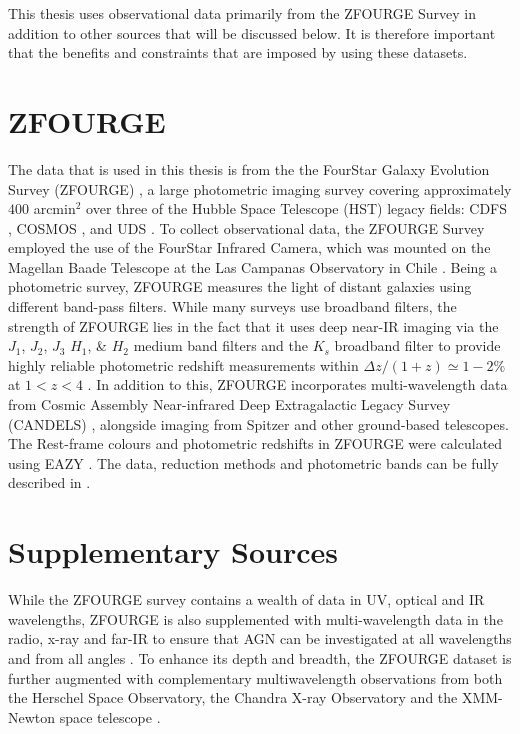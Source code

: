 This thesis uses observational data primarily from the ZFOURGE Survey in addition to other sources that will be discussed below. It is therefore important that the benefits and constraints that are imposed by using these datasets.

\section{ZFOURGE}
The data that is used in this thesis is from the the FourStar Galaxy Evolution Survey (ZFOURGE) \citep{straatman_fourstar_2016}, a large photometric imaging survey covering approximately $400$ arcmin$^2$ over three of the Hubble Space Telescope (HST) legacy fields: CDFS \citep{giacconi_chandra_2002}, COSMOS \citep{scoville_cosmic_2007}, and UDS \citep{lawrence_ukirt_2007}. To collect observational data, the ZFOURGE Survey employed the use of the FourStar Infrared Camera, which was mounted on the Magellan Baade Telescope at the Las Campanas Observatory in Chile \citep{persson_fourstar_2013}. Being a photometric survey, ZFOURGE measures the light of distant galaxies using different band-pass filters. While many surveys use broadband filters, the strength of ZFOURGE lies in the fact that it uses deep near-IR imaging via the $J_1$, $J_2$, $J_3$ $H_1$, \& $H_2$ medium band filters and the $K_s$ broadband filter to provide highly reliable photometric redshift measurements within $\Delta z/(1+z) \simeq 1 -2\%$ at $1 < z < 4$ \citep{straatman_fourstar_2016}. In addition to this, ZFOURGE incorporates multi-wavelength data from Cosmic Assembly Near-infrared Deep Extragalactic Legacy Survey (CANDELS) \citep{koekemoer_candels_2011, grogin_candels_2011, skelton_3d-hst_2014}, alongside imaging from Spitzer\cite{fazio_infrared_2004, rieke_multiband_2004} and other ground-based telescopes. The Rest-frame colours and photometric redshifts in ZFOURGE were calculated using EAZY \citep{brammer_eazy_2008}. The data, reduction methods and photometric bands can be fully described in \cite{straatman_fourstar_2016}.


\section{Supplementary Sources}
While the ZFOURGE survey contains a wealth of data in UV, optical and IR wavelengths, ZFOURGE is also supplemented with multi-wavelength data in the radio, x-ray and far-IR to ensure that AGN can be investigated at all wavelengths and from all angles \citep{padovani_active_2017}. To enhance its depth and breadth, the ZFOURGE dataset is further augmented with complementary multiwavelength observations from both the Herschel Space Observatory, the Chandra X-ray Observatory and the XMM-Newton space telescope \citep{cowley_zfourge_2016}.

